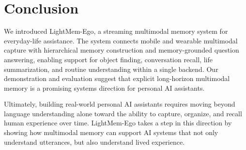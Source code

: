 \section{Conclusion}

We introduced LightMem-Ego, a streaming multimodal memory system for everyday-life assistance. 
The system connects mobile and wearable multimodal capture with hierarchical memory construction and memory-grounded question answering, enabling support for object finding, conversation recall, life summarization, and routine understanding within a single backend. 
Our demonstration and evaluation suggest that explicit long-horizon multimodal memory is a promising systems direction for personal AI assistants.

Ultimately, building real-world personal AI assistants requires moving beyond language understanding alone toward the ability to capture, organize, and recall human experience over time. 
LightMem-Ego takes a step in this direction by showing how multimodal memory can support AI systems that not only understand utterances, but also understand lived experience.